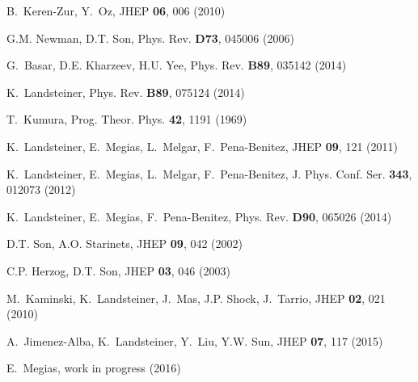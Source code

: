 \documentclass[epj]{webofc}
\begin{document}
\begin{thebibliography}{99}
B.~Keren-Zur, Y.~Oz, JHEP \textbf{06}, 006 (2010)

G.M. Newman, D.T. Son, Phys. Rev. \textbf{D73}, 045006 (2006)

G.~Basar, D.E. Kharzeev, H.U. Yee, Phys. Rev. \textbf{B89}, 035142 (2014)

K.~Landsteiner, Phys. Rev. \textbf{B89}, 075124 (2014)

T.~Kumura, Prog. Theor. Phys. \textbf{42}, 1191 (1969)

K.~Landsteiner, E.~Megias, L.~Melgar, F.~Pena-Benitez, JHEP \textbf{09}, 121 (2011)

K.~Landsteiner, E.~Megias, L.~Melgar, F.~Pena-Benitez, J. Phys. Conf. Ser.
  \textbf{343}, 012073 (2012)

K.~Landsteiner, E.~Megias, F.~Pena-Benitez, Phys. Rev. \textbf{D90}, 065026 (2014)

D.T. Son, A.O. Starinets, JHEP \textbf{09}, 042 (2002)

C.P. Herzog, D.T. Son, JHEP \textbf{03}, 046 (2003)

M.~Kaminski, K.~Landsteiner, J.~Mas, J.P. Shock, J.~Tarrio, JHEP \textbf{02},
  021 (2010)

A.~Jimenez-Alba, K.~Landsteiner, Y.~Liu, Y.W. Sun, JHEP \textbf{07}, 117 (2015)

E.~Megias, work in progress (2016)


\end{thebibliography}




%
\end{document}
